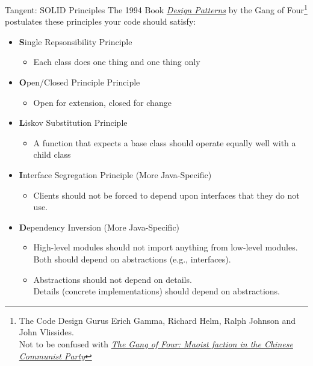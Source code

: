 \begin{frame}{Tangent: SOLID Principles}
%
\scriptsize The 1994 Book \emph{\color{blue} \href{https://en.wikipedia.org/wiki/Design_Patterns}{Design Patterns}} by the Gang of Four\footnote{%
	\tiny
	The Code Design Gurus Erich Gamma, Richard Helm, Ralph Johnson and John Vlissides.\\
	Not to be confused with \emph{\color{blue} \href{https://en.wikipedia.org/wiki/Gang_of_Four}{The Gang of Four: Maoist faction in the Chinese Communist Party}}
	} postulates these principles your code should satisfy:
%
\begin{itemize}
	\setlength\itemsep{0em}
	\item \textbf{S}ingle Repsonsibility Principle
		\begin{itemize}
		\scriptsize
		\item Each class does one thing and one thing only
		\end{itemize}
	\item \textbf{O}pen/Closed Principle Principle
		\begin{itemize}
		\scriptsize 
		\item Open for extension, closed for change
		\end{itemize}
	\item \textbf{L}iskov Substitution Principle
		\begin{itemize}
		\scriptsize 
		\item A function that expects a base class should operate equally well with a child class
		\end{itemize}
	\item \textbf{I}nterface Segregation Principle (More Java-Specific)
		\begin{itemize}
		\scriptsize 
		\item Clients should not be forced to depend upon interfaces that they do not use.
		\end{itemize}
	\item \textbf{D}ependency Inversion (More Java-Specific)
		\begin{itemize}
		\scriptsize 
		\item High-level modules should not import anything from low-level modules.\\
			Both should depend on abstractions (e.g., interfaces).
		\item Abstractions should not depend on details.\\
			Details (concrete implementations) should depend on abstractions.
		\end{itemize}
\end{itemize}
%
\end{frame}

